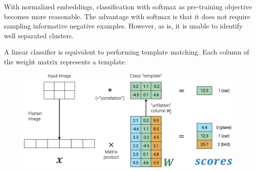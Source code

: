 \begin{remark}
    With normalized embeddings, classification with softmax as pre-training objective becomes more reasonable. The advantage with softmax is that it does not require sampling informative negative examples. However, as is, it is unable to identify well separated clusters.
\end{remark}

\begin{remark}
    A linear classifier is equivalent to performing template matching. Each column of the weight matrix represents a template.

    \begin{figure}[H]
        \centering
        \includegraphics[width=0.6\linewidth]{./img/_template_matching.jpg}
    \end{figure}
\end{remark}

